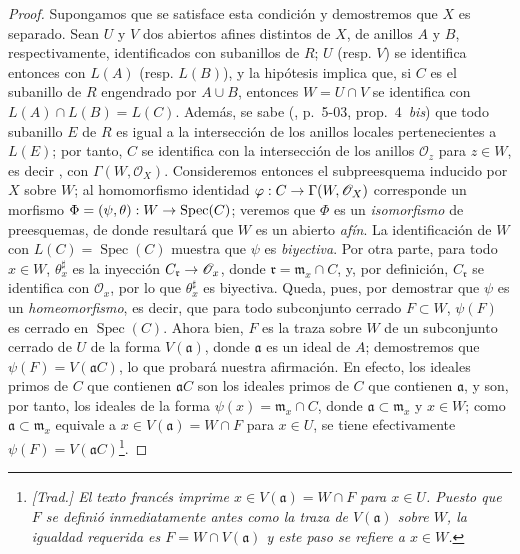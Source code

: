 \documentclass[oneside]{amsart}
\theoremstyle{ega-env-style}
\theoremstyle{ega-thm-env-style}
\theoremstyle{ega-defn-env-style}
\renewcommand{\to}{\mathchoice{\longrightarrow}{\rightarrow}{\rightarrow}{\rightarrow}}
\begin{document}
\begin{proof}
Supongamos que se satisface esta condición y demostremos que $X$ es separado.
Sean $U$ y $V$ dos abiertos afines distintos de $X$, de anillos $A$ y $B$, respectivamente, identificados con subanillos de $R$;
$U$ (resp. $V$) se identifica entonces  con $L(A)$ (resp. $L(B)$), y la hipótesis implica  que, si $C$ es el subanillo de $R$ engendrado por $A\cup B$, entonces $W=U\cap V$ se identifica con $L(A)\cap L(B)=L(C)$.
Además, se sabe (\cite{I-1}, p.~5-03, prop.~4~\emph{bis}) que todo subanillo $E$ de $R$ es igual a la intersección de los anillos locales pertenecientes a $L(E)$;
por tanto, $C$ se identifica con la intersección de los anillos $\mathscr{O}_z$ para $z\in W$, es decir , con $\Gamma(W,\mathscr{O}_X)$.
Consideremos entonces el subpreesquema inducido por $X$ sobre $W$;
al homomorfismo identidad $\varphi:C\to\Gamma(W,\mathscr{O}_X)$ corresponde  un morfismo $\Phi=(\psi,\theta):W\to\operatorname{Spec}(C)$;
veremos que $\Phi$ es un \emph{isomorfismo} de preesquemas, de donde resultará que $W$ es un abierto \emph{afín}.
La identificación de $W$ con $L(C)=\operatorname{Spec}(C)$ muestra que $\psi$ es \emph{biyectiva}.
Por otra parte, para todo $x\in W$, $\theta_x^\sharp$ es la inyección $C_\mathfrak r\to\mathscr{O}_x$, donde $\mathfrak r=\mathfrak m_x\cap C$, y, por definición, $C_\mathfrak r$ se identifica con $\mathscr{O}_x$, por lo que $\theta_x^\sharp$ es biyectiva.
Queda, pues, por demostrar que $\psi$ es un \emph{homeomorfismo}, es decir, que para todo subconjunto cerrado $F\subset W$, $\psi(F)$ es cerrado en
$\operatorname{Spec}(C)$.
Ahora bien, $F$ es la traza sobre $W$ de un subconjunto cerrado de $U$ de la forma $V(\mathfrak a)$, donde $\mathfrak a$ es un ideal de $A$;
demostremos que $\psi(F)=V(\mathfrak a C)$, lo que probará nuestra afirmación.
En efecto, los ideales primos de $C$ que contienen $\mathfrak a C$ son los ideales primos de $C$ que contienen $\mathfrak a$, y son, por tanto, los ideales de la forma $\psi(x)=\mathfrak m_x\cap C$, donde $\mathfrak a\subset\mathfrak m_x$ y $x\in W$;
como $\mathfrak a\subset\mathfrak m_x$ equivale a $x\in V(\mathfrak a)=W\cap F$ para $x\in U$, se tiene efectivamente $\psi(F)=V(\mathfrak a C)$\footnote{\emph{[Trad.] El texto francés imprime $x\in V(\mathfrak a)=W\cap F$ para $x\in U$. Puesto que $F$ se definió inmediatamente antes como la traza de $V(\mathfrak a)$ sobre $W$, la igualdad requerida es $F=W\cap V(\mathfrak a)$ y este paso se refiere a $x\in W$.}}.


\end{proof}
\end{document}
